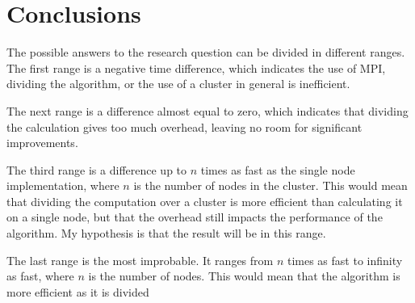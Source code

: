 \documentclass{sig-alternate-br}
\begin{document}
\section{Conclusions}
The possible answers to the research question can be divided in different ranges.
The first range is a negative time difference, which indicates the use of MPI, dividing the algorithm, or the use of a cluster in general is inefficient.

The next range is a difference almost equal to zero, which indicates that dividing the calculation gives too much overhead, leaving no room for significant improvements.

The third range is a difference up to $n$ times as fast as the single node implementation, where $n$ is the number of nodes in the cluster.
This would mean that dividing the computation over a cluster is more efficient than calculating it on a single node, but that the overhead still impacts the performance of the algorithm.
My hypothesis is that the result will be in this range.

The last range is the most improbable. It ranges from $n$ times as fast to infinity as fast, where $n$ is the number of nodes. This would mean that the algorithm is more efficient as it is divided 




\end{document}
